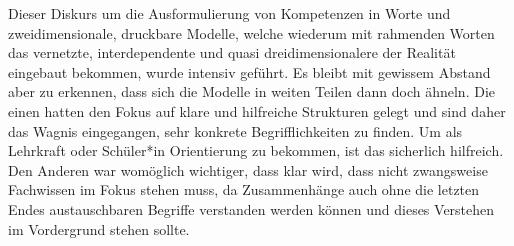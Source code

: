 







Dieser Diskurs um die Ausformulierung von Kompetenzen in Worte und zweidimensionale, druckbare Modelle, welche wiederum mit rahmenden Worten das vernetzte, interdependente und quasi dreidimensionalere der Realität eingebaut bekommen, wurde intensiv geführt. Es bleibt mit gewissem Abstand aber zu erkennen, dass sich die Modelle in weiten Teilen dann doch ähneln. 
Die einen \autocite{weißeno.2010} hatten den Fokus auf klare und hilfreiche Strukturen gelegt und sind daher das Wagnis eingegangen, sehr konkrete Begrifflichkeiten zu finden. Um als Lehrkraft oder Schüler*in Orientierung zu bekommen, ist das sicherlich hilfreich. Den Anderen \autocite{Besand.2011} war womöglich wichtiger, dass klar wird, dass nicht zwangsweise Fachwissen im Fokus stehen muss, da Zusammenhänge auch ohne die letzten Endes austauschbaren Begriffe verstanden werden können und dieses Verstehen im Vordergrund stehen sollte. 

